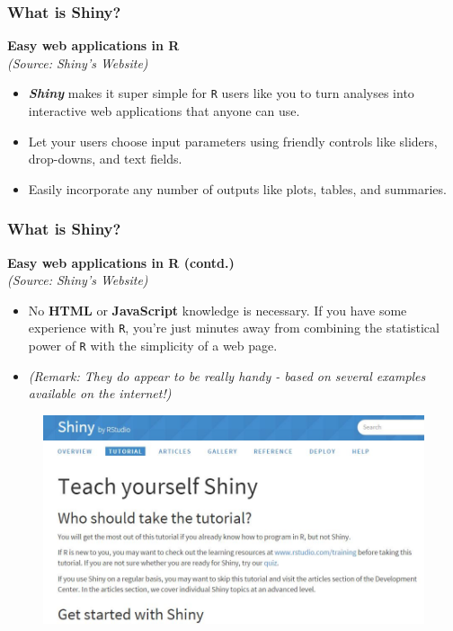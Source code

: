 \documentclass{beamer}
\begin{document}
\begin{frame}
\Large
\frametitle{What is Shiny?}
\textbf{Easy web applications in R}\\
\textit{(Source: Shiny's Website)}
\begin{itemize}
\item \textbf{\textit{Shiny}} makes it super simple for \texttt{R} users like you to turn analyses into interactive web applications that anyone can use. \item Let your users choose input parameters using friendly controls like sliders, drop-downs, and text fields. \item Easily incorporate any number of outputs like plots, tables, and summaries.
\end{itemize}
\end{frame}
\begin{frame}
\Large
\frametitle{What is Shiny?}
\vspace{-1cm}
\textbf{Easy web applications in R (contd.)}\\
\textit{(Source: Shiny's Website)}
\begin{itemize}
\item No \textbf{HTML} or \textbf{JavaScript} knowledge is necessary. If you have some experience with \texttt{R}, you’re just minutes away from combining the statistical power of \texttt{R} with the simplicity of a web page.
\item \textit{(Remark: They do appear to be really handy - based on several examples  available on the internet!)}
\end{itemize}

\end{frame}
\begin{frame}
	\begin{figure}
\centering
\includegraphics[width=0.7\linewidth]{shinytutorials}

\end{figure}

\end{frame}
\end{document}
